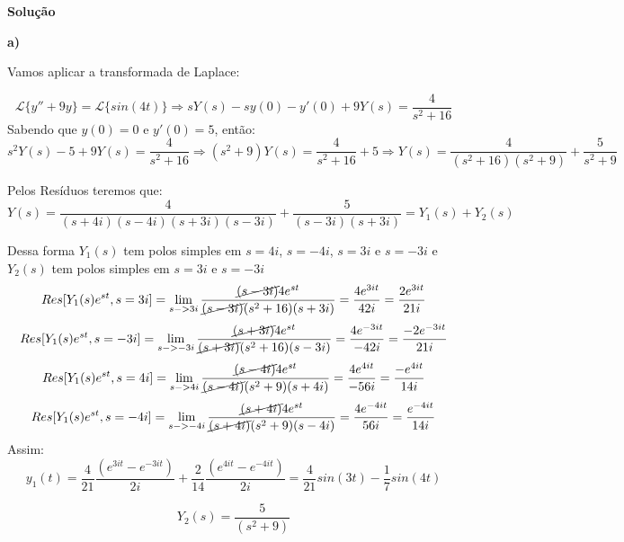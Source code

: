\linespread{1.5}

\textbf{Solução}

\textbf{a)}

Vamos aplicar a transformada de Laplace:

\begin{equation*}
    \mathcal{L}\{y'' + 9y\} = \mathcal{L}\{sin(4t)\} \Rightarrow sY(s) - sy(0) - y'(0) + 9Y(s) = \frac{4}{s^2+16}
\end{equation*}
Sabendo que $y(0) = 0$ e $y'(0) = 5$, então:
\begin{equation*}
    s^2Y(s) - 5 + 9Y(s) = \frac{4}{s^2+16} \Rightarrow (s^2+9)Y(s) = \frac{4}{s^2+16} + 5 \Rightarrow Y(s) = \frac{4}{(s^2+16)(s^2+9)} + \frac{5}{s^2+9}
\end{equation*}

Pelos Resíduos teremos que:
\begin{equation*}
    Y(s) = \frac{4}{(s+4i)(s-4i)(s+3i)(s-3i)} + \frac{5}{(s-3i)(s+3i)} = Y_1(s) + Y_2(s)
\end{equation*}

Dessa forma $Y_1(s)$ tem polos simples em $s=4i$, $s=-4i$, $s=3i$ e $s=-3i$ e $Y_2(s)$ tem polos simples em $s=3i$ e $s=-3i$
\begin{equation*}
    Res[Y_1(s)e^{st}, s=3i] = \lim_{s->3i} \frac{\cancel{(s-3i)}4e^{st}}{\cancel{(s-3i)}(s^2+16)(s+3i)} = \frac{4e^{3it}}{42i}=\frac{2e^{3it}}{21i}
\end{equation*}
\begin{equation*}
    Res[Y_1(s)e^{st}, s=-3i] = \lim_{s->-3i} \frac{\cancel{(s+3i)}4e^{st}}{\cancel{(s+3i)}(s^2+16)(s-3i)} = \frac{4e^{-3it}}{-42i}=\frac{-2e^{-3it}}{21i}
\end{equation*}
\begin{equation*}
    Res[Y_1(s)e^{st}, s=4i] = \lim_{s->4i} \frac{\cancel{(s-4i)}4e^{st}}{\cancel{(s-4i)}(s^2+9)(s+4i)} = \frac{4e^{4it}}{-56i}=\frac{-e^{4it}}{14i}
\end{equation*}
\begin{equation*}
    Res[Y_1(s)e^{st}, s=-4i] = \lim_{s->-4i} \frac{\cancel{(s+4i)}4e^{st}}{\cancel{(s+4i)}(s^2+9)(s-4i)} = \frac{4e^{-4it}}{56i}=\frac{e^{-4it}}{14i}
\end{equation*}
Assim:
\begin{equation*}
    y_1(t) = \frac{4}{21}\frac{(e^{3it}-e^{-3it})}{2i} + \frac{2}{14}\frac{(e^{4it}-e^{-4it})}{2i} = \frac{4}{21}sin(3t) - \frac{1}{7}sin(4t)
\end{equation*}

\begin{equation*}
    Y_2(s) = \frac{5}{(s^2+9)}
\end{equation*}


